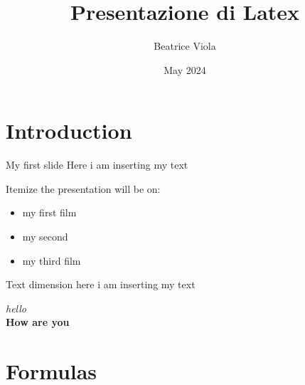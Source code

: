 \documentclass{beamer}
\title{Presentazione di Latex}
\author{Beatrice Viola}
\date{May 2024}
\begin{document}

\maketitle


\section{Introduction}

\begin{frame}{My first slide} %
    Here i am inserting my text
\end{frame}

\begin{frame}{Itemize}
the presentation will be on:
    \begin{itemize} %
        \item my first film
        \item \pause my second 
        \item \pause my third film
    \end{itemize}
\end{frame}

\begin{frame}{Text dimension} 
    \scriptsize{here i am inserting my text}
\end{frame}

\begin{frame}{4} 
    \textit{hello}\\ %
    \textbf{How are you} \\ %
    \bigskip %
\end{frame}

\section{Formulas}
\end{document}
